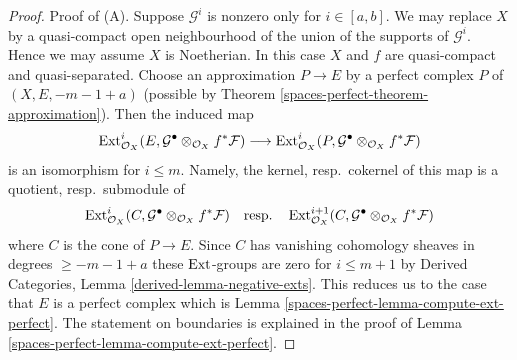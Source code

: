 \begin{proof}
Proof of (A). Suppose $\mathcal{G}^i$ is nonzero only for $i \in [a, b]$.
We may replace $X$ by a quasi-compact open neighbourhood of the union
of the supports of $\mathcal{G}^i$. Hence we may assume $X$ is Noetherian.
In this case $X$ and $f$ are quasi-compact and quasi-separated.
Choose an approximation $P \to E$ by a perfect complex $P$ of
$(X, E, -m - 1 + a)$
(possible by Theorem \ref{spaces-perfect-theorem-approximation}).
Then the induced map
$$
\operatorname{Ext}^i_{\mathcal{O}_X}(E,
\mathcal{G}^\bullet \otimes_{\mathcal{O}_X} f^*\mathcal{F})
\longrightarrow
\operatorname{Ext}^i_{\mathcal{O}_X}(P,
\mathcal{G}^\bullet \otimes_{\mathcal{O}_X} f^*\mathcal{F})
$$
is an isomorphism for $i \leq m$. Namely, the kernel, resp.\ cokernel of this
map is a quotient, resp.\ submodule of
$$
\operatorname{Ext}^i_{\mathcal{O}_X}(C,
\mathcal{G}^\bullet \otimes_{\mathcal{O}_X} f^*\mathcal{F})
\quad\text{resp.}\quad
\operatorname{Ext}^{i + 1}_{\mathcal{O}_X}(C,
\mathcal{G}^\bullet \otimes_{\mathcal{O}_X} f^*\mathcal{F})
$$
where $C$ is the cone of $P \to E$. Since $C$ has vanishing cohomology
sheaves in degrees $\geq -m - 1 + a$ these $\operatorname{Ext}$-groups are zero
for $i \leq m + 1$ by
Derived Categories, Lemma \ref{derived-lemma-negative-exts}.
This reduces us to the case that
$E$ is a perfect complex which is Lemma \ref{spaces-perfect-lemma-compute-ext-perfect}.
The statement on boundaries is explained in the proof of
Lemma \ref{spaces-perfect-lemma-compute-ext-perfect}.


\end{proof}
